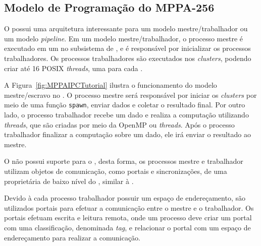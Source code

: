 \subsection{Modelo de Programação do MPPA-256}

%
%
%

O \mppa possui uma arquitetura interessante para um modelo mestre/trabalhador ou
um modelo \textit{pipeline}. Em um modelo
mestre/trabalhador, o processo mestre é executado em um \rman no subsistema de
\es, e é responsável por inicializar os processos trabalhadores. Os processos
trabalhadores são executados nos \textit{clusters}, podendo criar até 16 POSIX
\textit{threads}, uma para cada \pe.

A Figura~\ref{fig:MPPAIPCTutorial} ilustra o funcionamento do modelo mestre/escravo
no \mppa. O processo mestre será responsável por iniciar os
\textit{clusters} por meio de uma função \texttt{spawn}, enviar dados e coletar
o resultado final. Por outro lado, o processo trabalhador recebe um dado e
realiza a computação utilizando \textit{threads}, que são criadas por meio da
\api OpenMP ou \posix \textit{threads}. Após o processo trabalhador finalizar a computação sobre
um dado, ele irá enviar o resultado ao mestre.

O \mppa não possui suporte para o \mpi, desta forma, os processos mestre e
trabalhador utilizam objetos de comunicação, como portais e sincronizações, de
uma \api proprietária de baixo nível do \mppa, similar à \posix \ipc.

Devido à cada processo trabalhador possuir um espaço de endereçamento, são
utilizados portais para efetuar a comunicação entre o mestre e o trabalhador. Os
portais efetuam escrita e leitura remota, onde um processo deve criar um portal
com uma classificação, denominada \textit{tag}, e relacionar o portal com um
espaço de endereçamento para realizar a comunicação.

